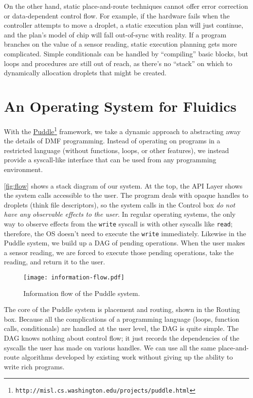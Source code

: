 \documentclass[
  10pt,
  a4paper,
  twocolumn,
]{article}
\def\puddleurl{http://misl.cs.washington.edu/projects/puddle.html}
\begin{document}
On the other hand, static place-and-route techniques cannot offer error correction or data-dependent control flow.
For example, if the hardware fails when the controller attempts to move a droplet, a static execution plan will just continue, and the plan's model of chip will fall out-of-sync with reality.
If a program branches on the value of a sensor reading, static execution planning gets more complicated.
Simple conditionals can be handled by ``compiling'' basic blocks, but loops and procedures are still out of reach, as there's no ``stack'' on which to dynamically allocation droplets that might be created.

\section*{An Operating System for Fluidics}

With the \href{\puddleurl}{Puddle}\footnote{\tt \puddleurl} framework, we take a dynamic approach to abstracting away the details of DMF programming.
Instead of operating on programs in a restricted language (without functions, loops, or other features),
we instead provide a syscall-like interface that can be used from any programming environment.

\autoref{fig:flow} shows a stack diagram of our system. At the top, the \textsf{API Layer} shows the system calls accessible to the user.
The program deals with opaque handles to droplets (think file descriptors), so the system calls in the \textsf{Control} box \emph{do not have any observable effects to the user}.
In regular operating systems, the only way to observe effects from the \texttt{write} syscall is with other syscalls like \texttt{read};
therefore, the OS doesn't need to execute the \texttt{write} immediately.
Likewise in the Puddle system, we build up a DAG of pending operations.
When the user makes a sensor reading, we are forced to execute those pending operations, take the reading, and return it to the user.

\begin{figure}
  \centering
  \texttt{[image: information-flow.pdf]}
  \caption{Information flow of the Puddle system.}
  \label{fig:flow}
\end{figure}

The core of the Puddle system is placement and routing, shown in the \textsf{Routing} box.
Because all the complications of a programming language (loops, function calls, conditionals) are handled at the user level, the DAG is quite simple.
The DAG knows nothing about control flow; it just records the dependencies of the syscalls the user has made on various handles.
We can use all the same place-and-route algorithms developed by existing work without giving up the ability to write rich programs.
\end{document}
